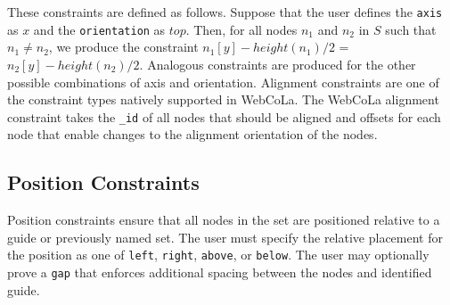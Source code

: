 These constraints are defined as follows.  Suppose that
the user defines the \texttt{axis}
as $x$ and the \texttt{orientation} as $top$.  Then, for all
nodes $n_1$ and $n_2$ in $S$
such that $n_1 \neq n_2$, we produce the constraint
$n_1[y] - height(n_1)/2$ = $n_2[y] - height(n_2)/2$.  Analogous constraints
are produced for the other possible combinations of axis and orientation.
Alignment constraints are one of the constraint types natively supported in
WebCoLa. The WebCoLa alignment constraint takes the \texttt{\_id} of all nodes
that should be aligned and offsets for each node that enable changes to the
alignment orientation of the nodes.




\subsection{Position Constraints}
Position constraints ensure that all nodes in the set are positioned relative to
a guide or previously named set. The user must specify the relative
placement for the position as one of \texttt{left}, \texttt{right}, 
\texttt{above}, or \texttt{below}.
The user may optionally prove a \texttt{gap} that enforces additional spacing
between the nodes and identified guide.

